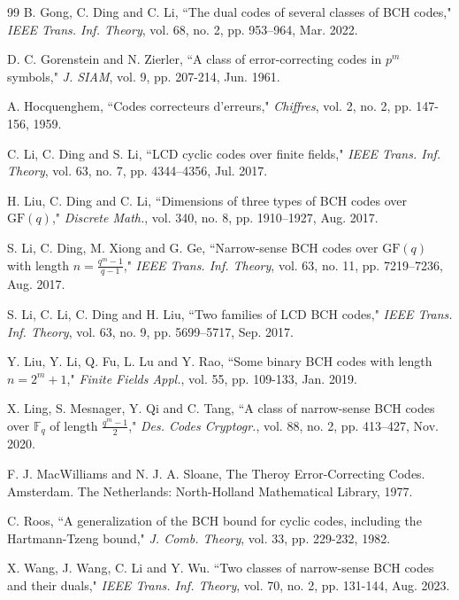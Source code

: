 \documentclass[12pt,draftcls,journal,onecolumn]{IEEEtran}
\newcommand{\gf}{{\mathrm{GF}}}
\begin{document}
\begin{thebibliography}{99}
B. Gong, C. Ding and C. Li, ``The dual codes of several classes of BCH codes," {\it IEEE
Trans. Inf. Theory},  vol. 68, no. 2, pp. 953--964, Mar. 2022.



 D. C. Gorenstein and N. Zierler, ``A class of error-correcting codes in $p^m$ symbols," {\it J. SIAM}, vol. 9, pp. 207-214, Jun. 1961.



 A. Hocquenghem, ``Codes correcteurs d'erreurs," {\it Chiffres}, vol. 2, no. 2, pp. 147-156, 1959.

 C. Li, C. Ding and S. Li, ``LCD cyclic codes over finite fields," {\it IEEE Trans.
Inf. Theory}, vol. 63, no. 7, pp. 4344--4356, Jul. 2017.

 H. Liu, C. Ding and C. Li, ``Dimensions of three types of BCH codes over $\gf(q)$,"
{\it Discrete Math.}, vol. 340, no. 8, pp. 1910--1927, Aug. 2017.




 S. Li, C. Ding, M. Xiong and G. Ge, ``Narrow-sense BCH codes over $\gf(q)$ with length $n=\frac{q^m-1}{q-1}$,"
{\it IEEE Trans. Inf. Theory}, vol. 63, no. 11, pp. 7219--7236, Aug. 2017.

 S. Li, C. Li, C. Ding and H. Liu, ``Two families of LCD BCH codes,"
{\it IEEE Trans. Inf. Theory}, vol. 63, no. 9, pp. 5699--5717, Sep. 2017.



 Y. Liu, Y. Li, Q. Fu, L. Lu and Y. Rao, ``Some binary BCH codes with length $n=2^m+1$," {\it Finite Fields Appl.}, vol. 55, pp. 109-133, Jan. 2019.

 X. Ling, S. Mesnager, Y. Qi and C. Tang, ``A class of narrow-sense BCH codes over $\mathbb{F}_q$ of length
$\frac{q^m-1}{2}$," {\it Des. Codes Cryptogr.}, vol. 88, no. 2, pp. 413--427, Nov. 2020.

 F. J. MacWilliams and N. J. A. Sloane,  The Theroy Error-Correcting Codes. Amsterdam. The Netherlands: North-Holland Mathematical Library, 1977.


 C. Roos, ``A generalization of the BCH bound for cyclic codes, including the Hartmann-Tzeng bound," {\it J. Comb. Theory}, vol. 33, pp. 229-232, 1982.

 X. Wang, J. Wang, C. Li and Y. Wu. ``Two classes of narrow-sense BCH codes and their duals," {\it IEEE Trans. Inf. Theory}, vol. 70, no. 2, pp. 131-144, Aug. 2023.


\end{thebibliography}
\end{document}
